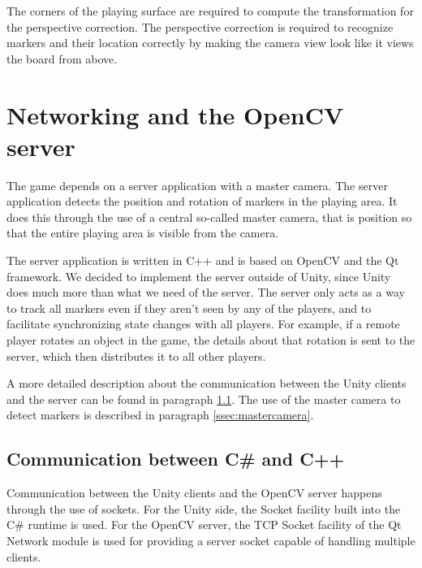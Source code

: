             The corners of the playing surface are required to compute the
            transformation for the perspective correction. The perspective
            correction is required to recognize markers and their location
            correctly by making the camera view look like it views the board
            from above.
        
    \section{Networking and the OpenCV server} \label{sec:network}
        The game depends on a server application with a master camera. The 
        server application detects the position and rotation of markers in the 
        playing area. It does this through the use of a central so-called master 
        camera, that is position so that the entire playing area is visible from 
        the camera.
        
        The server application is written in C++ and is based on OpenCV and the 
        Qt framework. We decided to implement the server outside of Unity, since 
        Unity does much more than what we need of the server. The server only 
        acts as a way to track all markers even if they aren't seen by any of 
        the players, and to facilitate synchronizing state changes with all 
        players. For example, if a remote player rotates an object in the game, 
        the details about that rotation is sent to the server, which then 
        distributes it to all other players.
        
        A more detailed description about the communication between the Unity 
        clients and the server can be found in paragraph \ref{ssec:communication}.
        The use of the master camera to detect markers is described in paragraph
        \ref{ssec:mastercamera}.
                
        \subsection{Communication between C\# and C++} \label{ssec:communication}
            Communication between the Unity clients and the OpenCV server 
            happens through the use of sockets. For the Unity side, the Socket 
            facility built into the C\# runtime is used. For the OpenCV server, 
            the TCP Socket facility of the Qt Network module is used for 
            providing a server socket capable of handling multiple clients. 
            
